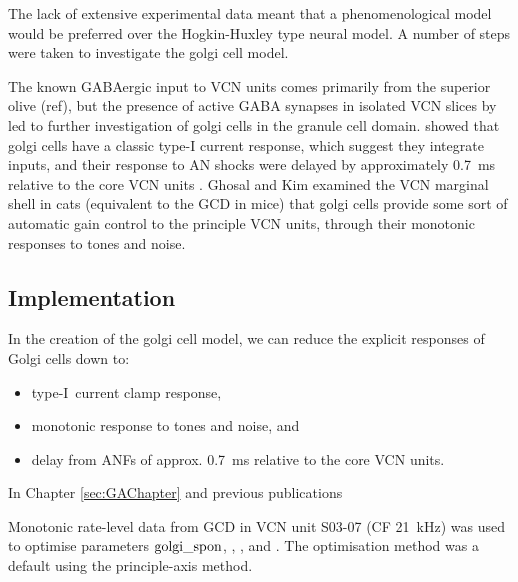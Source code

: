 \medskip{}

The lack of extensive experimental data meant that a phenomenological model
would be preferred over the Hogkin-Huxley type neural model. A number of steps
were taken to investigate the golgi cell model.

The known GABAergic input to VCN units comes primarily from the superior olive
(ref), but the presence of active GABA synapses in isolated VCN slices by
\citet{FerragamoGoldingEtAl:1998} led to further investigation of
golgi cells in the granule cell domain. \citet{FerragamoGoldingEtAl:1998a}
showed that golgi cells have a classic type-I current
response, which suggest they integrate inputs, and their response to
AN shocks were delayed by approximately 0.7~ms relative to the core
VCN units .  Ghosal and Kim
\citet{GhoshalKim:1997} examined the VCN marginal shell in cats (equivalent to the
GCD in mice) that golgi cells provide some sort of
automatic gain control to the principle VCN units, through their monotonic
responses to tones and noise.

\medskip{}

   



\newpage
\subsection{Implementation}
\vspace{1ex}


In the creation of the golgi cell model, we can reduce the explicit
responses of Golgi cells down to:\begin{itemize}\setlength{\itemsep}{-1em}
\item type-I~current clamp response,
\item monotonic response to tones and noise, and
\item delay from ANFs of approx. 0.7~ms relative to the core VCN units.
\end{itemize}

In Chapter \ref{sec:GAChapter} and previous publications \citep{EagerGraydenEtAl:2006a}


Monotonic rate-level data from GCD in VCN \citep{GhoshalKim:1996} unit S03-07
(CF 21~kHz) was used to optimise parameters ${\rm golgi\_spon}$, \wLSRGLG,
\wHSRGLG, and  \sANFGLG.  The optimisation method was a default  using the principle-axis method.


